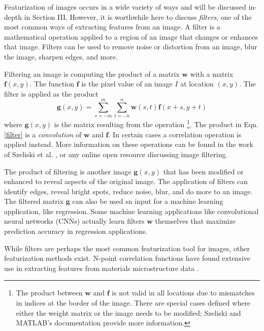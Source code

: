Featurization of images occurs in a wide variety of ways and will be discussed in-depth in Section III. However, it is worthwhile here to discuss \textit{filters}, one of the most common ways of extracting features from an image. A filter is a mathematical operation applied to a region of an image that changes or enhances that image. Filters can be used to remove noise or distortion from an image, blur the image, sharpen edges, and more. 

Filtering an image is computing the product of a matrix $\mathbf{w}$ with a matrix $\mathbf{f}(x,y)$. The function $\mathbf{f}$ is the pixel value of an image $I$ at location $(x,y)$. The filter is applied as the product
\begin{equation}
		\mathbf{g}(x,y) = \sum_{s = -m}^m \sum_{t=-n}^n \mathbf{w}(s,t) \mathbf{f}(x+s,y+t)
	\label{filter}
\end{equation}
where $\mathbf{g}(x,y)$ is the matrix resulting from the operation \footnote{The product between $\mathbf{w}$ and $\mathbf{f}$ is not valid in all locations due to mismatches in indices at the border of the image. There are special cases defined where either the weight matrix or the image needs to be modified; Szeliski \cite{Szeliski2011} and MATLAB's documentation \cite{MATLABPad} provide more information.}. The product in Eqn. \ref{filter} is a \textit{convolution} of $\mathbf{w}$ and $\mathbf{f}$. In certain cases a correlation operation is applied instead. More information on these operations can be found in the work of Szeliski et al. \cite{Szeliski2011}, or any online open resource discussing image filtering.

The product of filtering is another image $\mathbf{g}(x,y)$ that has been modified or enhanced to reveal aspects of the original image. The application of filters can identify edges, reveal bright spots, reduce noise, blur, and do more to an image. The filtered matrix $\mathbf{g}$ can also be used sn input for a machine learning application, like regression. Some machine learning applications like convolutional neural networks (CNNs) actually learn filters $\mathbf{w}$ themselves that maximize prediction accuracy in regression applications. 

While filters are perhaps the most common featurization tool for images, other featurization methods exist. N-point correlation functions have found extensive use in extracting features from materials microstructure data \cite{Fullwood2008}. 

